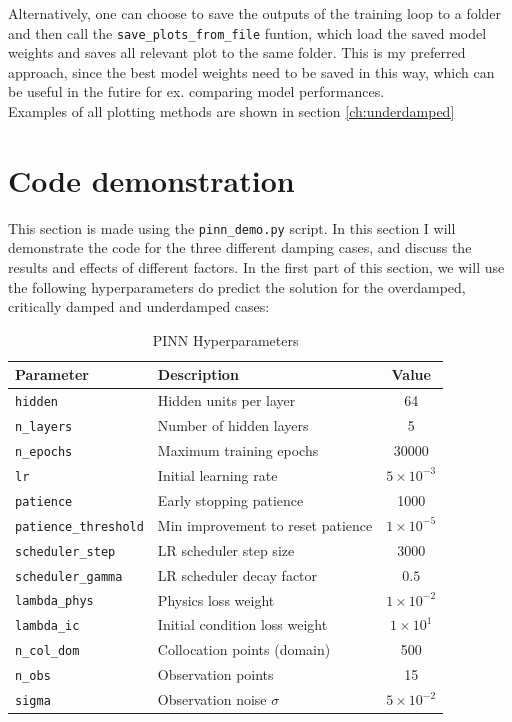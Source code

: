 \documentclass[we,twoside,openright,a4paper,11pt]{uantwerpenbamathesis}
\begin{document}
Alternatively, one can choose to save the outputs of the training loop to a folder and then call the \verb|save_plots_from_file| funtion, which load the saved model weights and saves all relevant plot to the same folder. This is my preferred approach, since the best model weights need to be saved in this way, which can be useful in the futire for ex. comparing model performances.\\

Examples of all plotting methods are shown in section \ref{ch:underdamped}

\section{Code demonstration}
This section is made using the \verb|pinn_demo.py| script. In this section I will demonstrate the code for the three different damping cases, and discuss the results and effects of different factors. In the first part of this section, we will use the following hyperparameters do predict the solution for the overdamped, critically damped and underdamped cases:

\begin{table}[H]
\centering
\caption{PINN Hyperparameters}\label{tab:standard_parameters_DHO}
\begin{tabular}{llc}
\toprule
\textbf{Parameter} & \textbf{Description} & \textbf{Value} \\
\midrule
\texttt{hidden}               & Hidden units per layer            & 64                   \\
\texttt{n\_layers}            & Number of hidden layers           & 5                    \\
\texttt{n\_epochs}            & Maximum training epochs           & 30000                \\
\texttt{lr}                   & Initial learning rate             & $5\times10^{-3}$     \\
\texttt{patience}             & Early stopping patience           & 1000                 \\
\texttt{patience\_threshold}  & Min improvement to reset patience & $1\times10^{-5}$     \\
\texttt{scheduler\_step}      & LR scheduler step size            & 3000                 \\
\texttt{scheduler\_gamma}     & LR scheduler decay factor         & $0.5$                \\
\texttt{lambda\_phys}         & Physics loss weight               & $1\times10^{-2}$     \\
\texttt{lambda\_ic}           & Initial condition loss weight     & $1\times10^{1}$      \\
\texttt{n\_col\_dom}          & Collocation points (domain)       & 500                  \\
\texttt{n\_obs}               & Observation points                & 15                   \\
\texttt{sigma}                & Observation noise $\sigma$        & $5\times10^{-2}$     \\
\bottomrule
\end{tabular}
\end{table}
\end{document}
